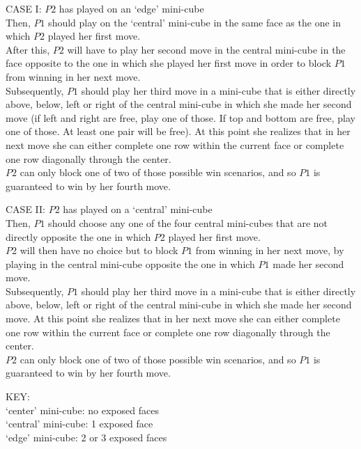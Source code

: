 \documentclass{article}
\begin{document}
\medskip
CASE I: $P2$ has played on an `edge' mini-cube \\
Then, $P1$ should play on the `central' mini-cube in the same face as the one in which $P2$ played her first move. \\
After this, $P2$ will have to play her second move in the central mini-cube in the face opposite to the one in which she played her first move in order to block $P1$ from winning in her next move. \\
Subsequently, $P1$ should play her third move in a mini-cube that is either directly above, below, left or right of the central mini-cube in which she made her second move (if left and right are free, play one of those. If top and bottom are free, play one of those. At least one pair will be free). At this point she realizes that in her next move she can either complete one row within the current face or complete one row diagonally through the center. \\
$P2$ can only block one of two of those possible win scenarios, and so $P1$ is guaranteed to win by her fourth move.

\medskip
CASE II: $P2$ has played on a `central' mini-cube \\
Then, $P1$ should choose any one of the four central mini-cubes that are not directly opposite the one in which $P2$ played her first move. \\
$P2$ will then have no choice but to block $P1$ from winning in her next move, by playing in the central mini-cube opposite the one in which $P1$ made her second move. \\
Subsequently, $P1$ should play her third move in a mini-cube that is either directly above, below, left or right of the central mini-cube in which she made her second move. At this point she realizes that in her next move she can either complete one row within the current face or complete one row diagonally through the center. \\
$P2$ can only block one of two of those possible win scenarios, and so $P1$ is guaranteed to win by her fourth move.

\medskip
KEY: \\
`center' mini-cube: no exposed faces \\
`central' mini-cube: 1 exposed face \\
`edge' mini-cube: 2 or 3 exposed faces
 
\end{document}
